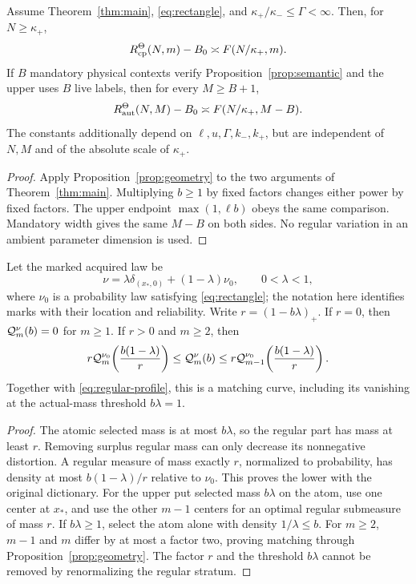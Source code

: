 \begin{corollary}\label{cor:regular}
Assume Theorem~\ref{thm:main}, \eqref{eq:rectangle}, and $\kappa_+/\kappa_-\le\Gamma<\infty$. Then, for $N\ge\kappa_+$,
\[
 R_{\mathrm{cp}}^\Theta(N,m)-B_0\asymp F(N/\kappa_+,m).
\]
If $B$ mandatory physical contexts verify Proposition~\ref{prop:semantic} and the upper uses $B$ live labels, then for every $M\ge B+1$,
\begin{equation}\label{eq:matched-aut}
 R_{\mathrm{aut}}^\Theta(N,M)-B_0\asymp F(N/\kappa_+,M-B).
\end{equation}
The constants additionally depend on $\ell,u,\Gamma,k_-,k_+$, but are independent of $N,M$ and of the absolute scale of $\kappa_+$.
\end{corollary}
\begin{proof}
Apply Proposition~\ref{prop:geometry} to the two arguments of Theorem~\ref{thm:main}. Multiplying $b\ge1$ by fixed factors changes either power by fixed factors. The upper endpoint $\max(1,\ell b)$ obeys the same comparison. Mandatory width gives the same $M-B$ on both sides. No regular variation in an ambient parameter dimension is used.
\end{proof}

\begin{theorem}\label{thm:atomic}
Let the marked acquired law be
\[
 \nu=\lambda\delta_{(x_*,0)}+(1-\lambda)\nu_0,
 \qquad 0<\lambda<1,
\]
where $\nu_0$ is a probability law satisfying \eqref{eq:rectangle}; the notation here identifies marks with their location and reliability. Write $r=(1-b\lambda)_+$. If $r=0$, then $\mathcal Q_m^\nu(b)=0$ for $m\ge1$. If $r>0$ and $m\ge2$, then
\begin{equation}\label{eq:atomic-profile}
 r\mathcal Q_m^{\nu_0}\!\left(\frac{b(1-\lambda)}r\right)
 \le\mathcal Q_m^\nu(b)
 \le r\mathcal Q_{m-1}^{\nu_0}\!\left(\frac{b(1-\lambda)}r\right).
\end{equation}
Together with \eqref{eq:regular-profile}, this is a matching curve, including its vanishing at the actual-mass threshold $b\lambda=1$.
\end{theorem}
\begin{proof}
The atomic selected mass is at most $b\lambda$, so the regular part has mass at least $r$. Removing surplus regular mass can only decrease its nonnegative distortion. A regular measure of mass exactly $r$, normalized to probability, has density at most $b(1-\lambda)/r$ relative to $\nu_0$. This proves the lower with the original dictionary. For the upper put selected mass $b\lambda$ on the atom, use one center at $x_*$, and use the other $m-1$ centers for an optimal regular submeasure of mass $r$. If $b\lambda\ge1$, select the atom alone with density $1/\lambda\le b$. For $m\ge2$, $m-1$ and $m$ differ by at most a factor two, proving matching through Proposition~\ref{prop:geometry}. The factor $r$ and the threshold $b\lambda$ cannot be removed by renormalizing the regular stratum.
\end{proof}

